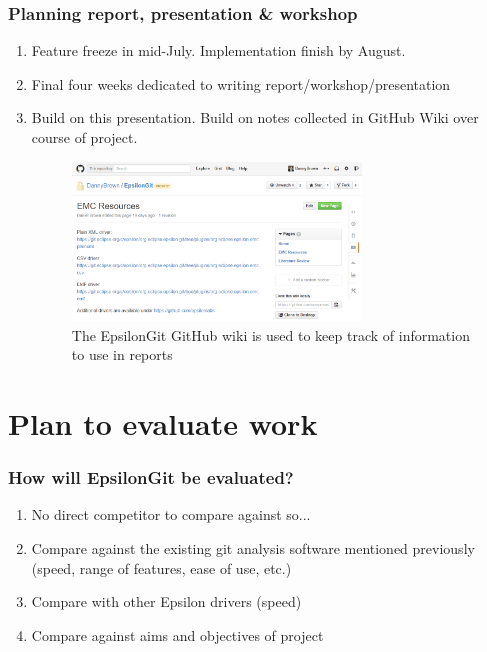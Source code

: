 \documentclass[aspectratio=1610]{beamer}
\begin{document}
\begin{frame}
\frametitle{Planning report, presentation \& workshop}	
\begin{enumerate}
	\item Feature freeze in mid-July. Implementation finish by August.
	\item Final four weeks dedicated to writing report/workshop/presentation
	\item Build on this presentation. Build on notes collected in GitHub Wiki over course of project.
	\begin{figure}[H]
		\centering
		\includegraphics[width=290px]{images/github-wiki}
		\caption{The EpsilonGit GitHub wiki is used to keep track of information to use in reports}
	\end{figure} 
\end{enumerate}	
\end{frame}


\section{Plan to evaluate work}
\begin{frame}
\frametitle{How will EpsilonGit be evaluated?}
\begin{enumerate}
	\item No direct competitor to compare against so...
	\item Compare against the existing git analysis software mentioned previously (speed, range of features, ease of use, etc.)
	\item Compare with other Epsilon drivers (speed)
	\item Compare against aims and objectives of project
\end{enumerate}	
\end{frame}
\end{document}
